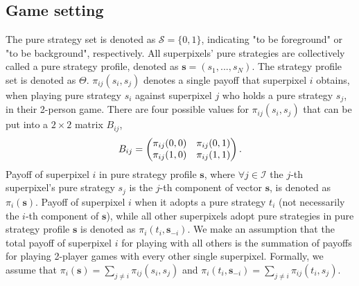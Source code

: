 \documentclass[journal]{IEEEtran}
\begin{document}
\subsection{Game setting}\label{gamesetting}
The pure strategy set is denoted as $\mathcal{S} = \{0, 1\}$, indicating "to be foreground" or "to be background", respectively. All superpixels' pure strategies are collectively called a pure strategy profile, denoted as $\boldsymbol{s} = (s_1, ..., s_N)$. The strategy profile set is denoted as $\Theta$. $\pi_{ij}(s_i, s_j)$ denotes a single payoff that superpixel $i$ obtains, when playing pure strategy $s_i$ against superpixel $j$ who holds a pure strategy $s_j$, in their 2-person game. There are four possible values for $\pi_{ij}(s_i, s_j)$ that can be put into a $2\times2$ matrix
$B_{ij}$, 
\begin{equation}
\setlength{\abovedisplayskip}{2pt}
\setlength{\belowdisplayskip}{2pt}
\label{pmatrix}
B_{ij} = \begin{pmatrix} \pi_{ij}(0, 0) & \pi_{ij}(0, 1) \\ \pi_{ij}(1, 0) &  \pi_{ij}(1, 1) \end{pmatrix} \\.
\end{equation}
Payoff of superpixel $i$ in pure strategy profile $\boldsymbol{s}$, where $\forall j \in \mathcal{I}$ the $j$-th superpixel's pure strategy $s_j$ is the $j$-th component of vector $\boldsymbol{s}$, is denoted as $\pi_i(\boldsymbol{s})$. Payoff of superpixel $i$ when it adopts a pure strategy $t_i$ (not necessarily the $i$-th component of $\boldsymbol{s}$), while all other superpixels adopt pure strategies in pure strategy profile $\boldsymbol{s}$ is denoted as $\pi_{i}(t_i, \boldsymbol{s}_{-i})$. We make an assumption that the total payoff of superpixel $i$ for playing with all others is the summation of payoffs for playing 2-player games with every other single superpixel. Formally, we assume that $\pi_{i}(\boldsymbol{s}) = \sum_{j \neq i} \pi_{ij}(s_i, s_j)$ and $\pi_{i}(t_i, \boldsymbol{s}_{-i}) = \sum_{j \neq i} \pi_{ij}(t_i, s_j)$.  %
\end{document}
